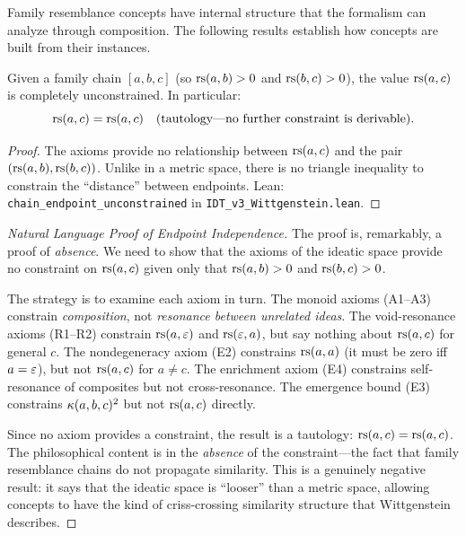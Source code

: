 Family resemblance concepts have internal structure that the formalism can
analyze through composition. The following results establish how concepts
are built from their instances.

\begin{theorem}
\label{thm:endpoint-unconstrained}
Given a family chain $[a, b, c]$ (so $\mathrm{rs}(a, b) > 0$ and $\mathrm{rs}(b, c) > 0$),
the value $\mathrm{rs}(a, c)$ is completely unconstrained. In particular:
\[
\mathrm{rs}(a, c) = \mathrm{rs}(a, c) \quad \text{(tautology---no further constraint is derivable).}
\]
\end{theorem}

\begin{proof}
The axioms provide no relationship between $\mathrm{rs}(a, c)$ and the pair
$(\mathrm{rs}(a, b), \mathrm{rs}(b, c))$. Unlike in a metric space, there is no triangle
inequality to constrain the ``distance'' between endpoints.
Lean: \texttt{chain\_endpoint\_unconstrained} in
\texttt{IDT\_v3\_Wittgenstein.lean}.
\end{proof}

\begin{proof}[Natural Language Proof of Endpoint Independence]
The proof is, remarkably, a proof of \emph{absence}. We need to show that the
axioms of the ideatic space provide no constraint on $\mathrm{rs}(a, c)$ given only that
$\mathrm{rs}(a, b) > 0$ and $\mathrm{rs}(b, c) > 0$.

The strategy is to examine each axiom in turn. The monoid axioms (A1--A3)
constrain \emph{composition}, not \emph{resonance between unrelated ideas}.
The void-resonance axioms (R1--R2) constrain $\mathrm{rs}(a, \varepsilon)$ and $\mathrm{rs}(\varepsilon, a)$,
but say nothing about $\mathrm{rs}(a, c)$ for general $c$. The nondegeneracy axiom (E2)
constrains $\mathrm{rs}(a, a)$ (it must be zero iff $a = \varepsilon$), but not $\mathrm{rs}(a, c)$
for $a \neq c$. The enrichment axiom (E4) constrains self-resonance of
composites but not cross-resonance. The emergence bound (E3) constrains
$\kappa(a, b, c)^2$ but not $\mathrm{rs}(a, c)$ directly.

Since no axiom provides a constraint, the result is a tautology:
$\mathrm{rs}(a, c) = \mathrm{rs}(a, c)$. The philosophical content is in the \emph{absence}
of the constraint---the fact that family resemblance chains do not propagate
similarity. This is a genuinely negative result: it says that the ideatic space
is ``looser'' than a metric space, allowing concepts to have the kind of
criss-crossing similarity structure that Wittgenstein describes.
\end{proof}

